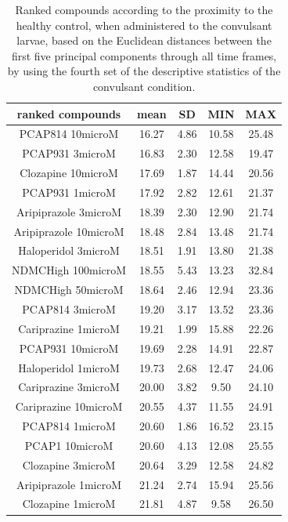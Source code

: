 \documentclass[a4paper,12pt]{article}
\begin{document}
\begin{table}[h!]\tiny
\centering
\caption{Ranked compounds according to the proximity to the healthy control, when administered to the convulsant larvae, based on the Euclidean distances between the first five principal components through all time frames, by using the fourth set of the descriptive statistics of the convulsant condition.}
\begin{tabular}{|c|c|c|c|c|}
\hline
ranked compounds             & mean & SD   & MIN  & MAX   \\ \hline
PCAP814 10microM      & 16.27 & 4.86 & 10.58 & 25.48 \\ \hline
PCAP931 3microM       & 16.83 & 2.30  & 12.58 & 19.47 \\ \hline
Clozapine 10microM    & 17.69 & 1.87 & 14.44 & 20.56 \\ \hline
PCAP931 1microM       & 17.92 & 2.82 & 12.61 & 21.37 \\ \hline
Aripiprazole 3microM  & 18.39 & 2.30  & 12.90  & 21.74 \\ \hline
Aripiprazole 10microM & 18.48 & 2.84 & 13.48 & 21.74 \\ \hline
Haloperidol 3microM   & 18.51 & 1.91 & 13.80  & 21.38 \\ \hline
NDMCHigh 100microM    & 18.55 & 5.43 & 13.23 & 32.84 \\ \hline
NDMCHigh 50microM     & 18.64 & 2.46 & 12.94 & 23.36 \\ \hline
PCAP814 3microM       & 19.20  & 3.17 & 13.52 & 23.36 \\ \hline
Cariprazine 1microM   & 19.21 & 1.99 & 15.88 & 22.26 \\ \hline
PCAP931 10microM      & 19.69 & 2.28 & 14.91 & 22.87 \\ \hline
Haloperidol 1microM   & 19.73 & 2.68 & 12.47 & 24.06 \\ \hline
Cariprazine 3microM   & 20.00    & 3.82 & 9.50   & 24.10  \\ \hline
Cariprazine 10microM  & 20.55 & 4.37 & 11.55 & 24.91 \\ \hline
PCAP814 1microM       & 20.60  & 1.86 & 16.52 & 23.15 \\ \hline
PCAP1 10microM        & 20.60  & 4.13 & 12.08 & 25.55 \\ \hline
Clozapine 3microM     & 20.64 & 3.29 & 12.58 & 24.82 \\ \hline
Aripiprazole 1microM  & 21.24 & 2.74 & 15.94 & 25.56 \\ \hline
Clozapine 1microM     & 21.81 & 4.87 & 9.58  & 26.50  \\ \hline

\end{tabular}
\end{table}
\end{document}
